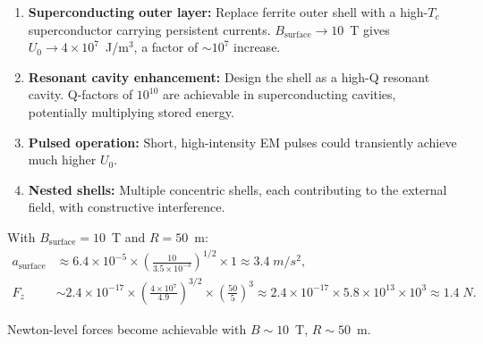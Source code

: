 \documentclass[amsmath,amssymb,aps,prd,superscriptaddress,nofootinbib]{revtex4-2}
\begin{document}
\begin{enumerate}
\item \textbf{Superconducting outer layer:} Replace ferrite outer shell
  with a high-$T_c$ superconductor carrying persistent currents.
  $B_\text{surface} \to 10$~T gives $U_0 \to 4 \times 10^7$~J/m$^3$,
  a factor of $\sim 10^7$ increase.

\item \textbf{Resonant cavity enhancement:} Design the shell as a
  high-Q resonant cavity. Q-factors of $10^{10}$ are achievable in
  superconducting cavities, potentially multiplying stored energy.

\item \textbf{Pulsed operation:} Short, high-intensity EM pulses could
  transiently achieve much higher $U_0$.

\item \textbf{Nested shells:} Multiple concentric shells, each
  contributing to the external field, with constructive interference.
\end{enumerate}

With $B_\text{surface} = 10$~T and $R = 50$~m:
\begin{align}
a_\text{surface} &\approx 6.4 \times 10^{-5} \times \left(\frac{10}{3.5 \times 10^{-3}}\right)^{1/2} \times 1 \approx 3.4 \; \si{m/s^2}, \\
F_z &\sim 2.4 \times 10^{-17} \times \left(\frac{4 \times 10^7}{4.9}\right)^{3/2} \times \left(\frac{50}{5}\right)^3 \approx 2.4 \times 10^{-17} \times 5.8 \times 10^{13} \times 10^3 \approx 1.4 \; \si{N}.
\end{align}

Newton-level forces become achievable with $B \sim 10$~T, $R \sim 50$~m.
\end{document}
